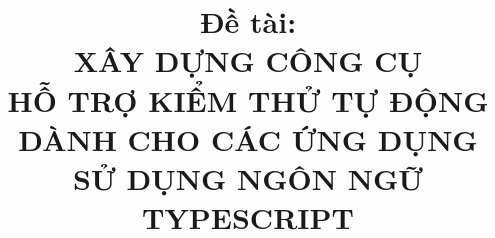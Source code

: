 \documentclass[13pt,a4paper, oneside]{report} %
\title{{\Large Đề tài:}\\XÂY DỰNG CÔNG CỤ\\
HỖ TRỢ KIỂM THỬ TỰ ĐỘNG\\
DÀNH CHO CÁC ỨNG DỤNG \\
SỬ DỤNG NGÔN NGỮ TYPESCRIPT
}
\begin{document}
\coverpage

\frontmatter
\end{document}
